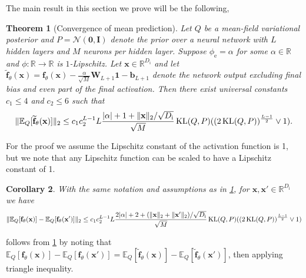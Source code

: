 \documentclass[twoside]{article}
\renewcommand{\ss}[1]{_{\text{#1}}}
\newcommand{\vnull}{\mathbf{0}}
\newcommand{\vb}{\mathbf{b}}
\newcommand{\vf}{\mathbf{f}}
\newcommand{\vx}{\mathbf{x}}
\newcommand{\vone}{\mathbf{1}}
\newcommand{\mI}{\mathbf{I}}
\newcommand{\mW}{\mathbf{W}}
\newcommand{\E}{\mathbb{E}}
\renewcommand{\P}{\mathbb{P}}
\newcommand{\Q}{\mathbb{Q}}
\renewcommand{\Q}{\ensuremath{Q}}
\renewcommand{\P}{\ensuremath{P}}
\newcommand{\R}{\mathbb{R}}
\newcommand{\KL}{\operatorname{KL}}
\newcommand{\Normal}{\mathcal{N}}
\renewcommand{\ss}[1]{_{\text{#1}}}        %
\DeclarePairedDelimiter\parens{(}{)}             %
\DeclarePairedDelimiter\norm{\|}{\|}             %
\DeclarePairedDelimiter\abs{|}{|}                %
\theoremstyle{theoremstyle}
\newtheorem{theorem}{Theorem}
\newtheorem{corollary}[theorem]{Corollary}
\newtheorem{remark}[theorem]{Remark}
\begin{document}
The main result in this section we prove will be the following,
\begin{theorem}[Convergence of mean prediction] \label{thm:app-convergence-of-mean}
    Let $Q$ be a mean-field variational posterior and $P=\Normal(\vnull,\mI)$ denote the prior over a neural network with $L$ hidden layers and $M$ neurons per hidden layer.
    Suppose $\phi\ss{e}=\alpha$ for some $\alpha \in \R$ and $\phi\colon \R \to \R$ is $1$-Lipschitz.
    Let $\vx \in \R^{D\ss{i}}$ and let $\widetilde{\vf}_{\theta}(\vx) = \vf_\theta(\vx) - \tfrac\alpha{\sqrt{M}}\mW_{L+1}\vone - \vb_{L+1}$ denote the network output excluding final bias and even part of the final activation.
    Then there exist universal constants $c_1 \leq 4$ and $c_2 \leq 6$ such that %
    \begin{equation}
         \norm{\E_Q[\widetilde{\vf}_{\theta}(\vx)]}_2
        \le c_1c_2^{L-1} L \frac{\abs{\alpha} + 1+ \|\vx\|_2/\sqrt{D\ss{i}}}{\sqrt{M}} \KL(Q, P) \parens{(2\KL(\Q, \P))^\frac{L-1}{2} \lor 1}.
    \end{equation}
\end{theorem}
For the proof we assume the Lipschitz constant of the activation function is 1, but we note that any Lipschitz function can be scaled to have a Lipschitz constant of 1. 

\begin{corollary}\label{cor:difference-of-means}
    With the same notation and assumptions as in \cref{thm:app-convergence-of-mean}, for $\vx, \vx' \in \R^{D\ss{i}}$ we have 
    \begin{align}
        \norm{\E_Q[\vf_{\theta}(\vx)] -\E_Q[\vf_{\theta}(\vx')]}_2 \leq c_1c_2^{L-1} L \frac{2\abs{\alpha} + 2+( \|\vx\|_2+\|\vx'\|_2)/\sqrt{D\ss{i}}}{\sqrt{M}} \KL(Q, P) \parens{(2\KL(\Q, \P))^\frac{L-1}{2} \lor 1}
    \end{align}
\end{corollary}
 follows from \cref{thm:app-convergence-of-mean} by noting that $\E_Q[\vf_{\theta}(\vx)] -\E_Q[\vf_{\theta}(\vx')] = \E_Q[\widetilde{\vf}_{\theta}(\vx)] -\E_Q[\widetilde{\vf}_{\theta}(\vx')]$, then applying triangle inequality.

 
\end{document}
